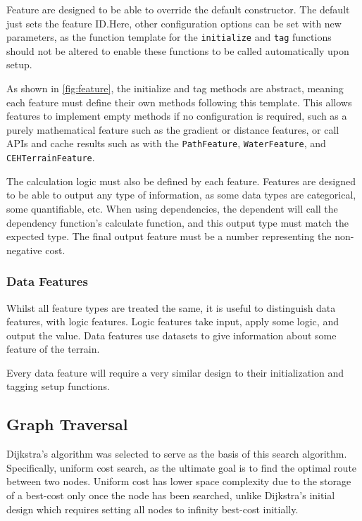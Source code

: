 \documentclass[12pt]{article}
\begin{document}
Feature are designed to be able to override the default constructor. The default just sets the feature ID.\@ Here, other configuration options can be set with new parameters, as the function template for the \texttt{initialize} and \texttt{tag} functions should not be altered to enable these functions to be called automatically upon setup.

As shown in \autoref{fig:feature}, the initialize and tag methods are abstract, meaning each feature must define their own methods following this template. This allows features to implement empty methods if no configuration is required, such as a purely mathematical feature such as the gradient or distance features, or call APIs and cache results such as with the \texttt{PathFeature}, \texttt{WaterFeature}, and \texttt{CEHTerrainFeature}.

The calculation logic must also be defined by each feature. Features are designed to be able to output any type of information, as some data types are categorical, some quantifiable, etc. When using dependencies, the dependent will call the dependency function's calculate function, and this output type must match the expected type. The final output feature must be a number representing the non-negative cost.

\subsubsection{Data Features}

Whilst all feature types are treated the same, it is useful to distinguish data features, with logic features. Logic features take input, apply some logic, and output the value. Data features use datasets to give information about some feature of the terrain.

Every data feature will require a very similar design to their initialization and tagging setup functions.

\subsection{Graph Traversal}

Dijkstra's algorithm was selected to serve as the basis of this search algorithm. Specifically, uniform cost search, as the ultimate goal is to find the optimal route between two nodes. Uniform cost has lower space complexity due to the storage of a best-cost only once the node has been searched, unlike Dijkstra's initial design which requires setting all nodes to infinity best-cost initially.
\end{document}
